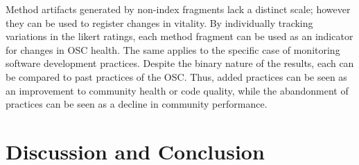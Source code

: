 \documentclass[final,5p,times,twocolumn]{elsarticle}
\begin{document}
Method artifacts generated by non-index fragments lack a distinct scale; however they can be used to register changes in vitality. By individually tracking variations in the likert ratings, each method fragment can be used as an indicator for changes in OSC health. The same applies to the specific case of monitoring software development practices. Despite the binary nature of the results, each can be compared to past practices of the OSC. Thus, added practices can be seen as an improvement to community health or code quality, while the abandonment of practices can be seen as a decline in community performance. 

\section{Discussion and Conclusion}
\label{discussion_conclusion_section}







\end{document}
